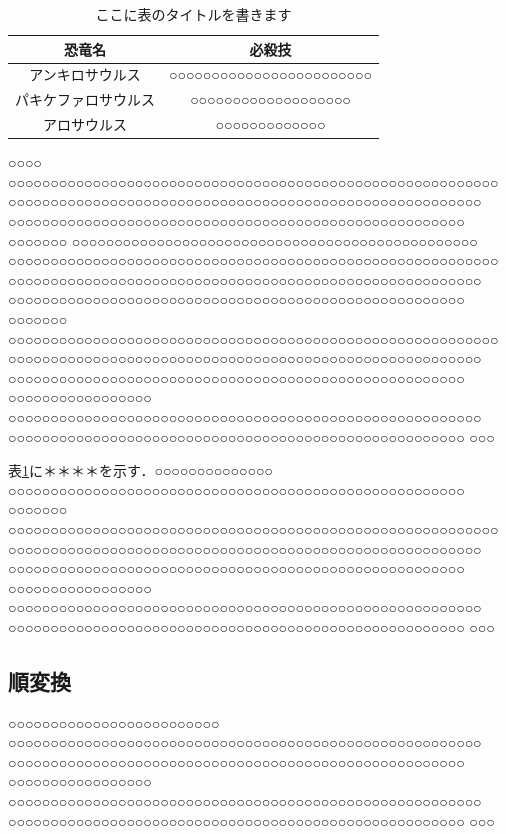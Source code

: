 \begin{table}
\begin{center}
\caption{ここに表のタイトルを書きます}\label{AAA}
\begin{tabular}{cc}
\hline
恐竜名 & 必殺技 \\
\hline
アンキロサウルス & ○○○○○○○○○○○○○○○○○○○○○○○○  \\
パキケファロサウルス & ○○○○○○○○○○○○○○○○○○○  \\
アロサウルス & ○○○○○○○○○○○○○  \\
\hline
\end{tabular}
\end{center}
\end{table}
○○○○ ○○○○○○○○○○○○○○○○○○○○○○○○○○○○○○○○○○○○○○○○○○○○○○○○○○○○○○○○○○ ○○○○○○○○○○○○○○○○○○○○○○○○○○○○○○○○○○○○○○○○○○○○○○○○○○○○○○○○ ○○○○○○○○○○○○○○○○○○○○○○○○○○○○○○○○○○○○○○○○○○○○○○○○○○○○○○ ○○○○○○○ ○○○○○○○○○○○○○○○○○○○○○○○○○○○○○○○○○○○○○○○○○○○○○○○○ ○○○○○○○○○○○○○○○○○○○○○○○○○○○○○○○○○○○○○○○○○○○○○○○○○○○○○○○○○○ ○○○○○○○○○○○○○○○○○○○○○○○○○○○○○○○○○○○○○○○○○○○○○○○○○○○○○○○○ ○○○○○○○○○○○○○○○○○○○○○○○○○○○○○○○○○○○○○○○○○○○○○○○○○○○○○○ ○○○○○○○ ○○○○○○○○○○○○○○○○○○○○○○○○○○○○○○○○○○○○○○○○○○○○○○○○○○○○○○○○○○ ○○○○○○○○○○○○○○○○○○○○○○○○○○○○○○○○○○○○○○○○○○○○○○○○○○○○○○○○ ○○○○○○○○○○○○○○○○○○○○○○○○○○○○○○○○○○○○○○○○○○○○○○○○○○○○○○ ○○○○○○○○○○○○○○○○○ ○○○○○○○○○○○○○○○○○○○○○○○○○○○○○○○○○○○○○○○○○○○○○○○○○○○○○○○○ ○○○○○○○○○○○○○○○○○○○○○○○○○○○○○○○○○○○○○○○○○○○○○○○○○○○○○○ ○○○

表\ref{AAA}に＊＊＊＊を示す．○○○○○○○○○○○○○○ ○○○○○○○○○○○○○○○○○○○○○○○○○○○○○○○○○○○○○○○○○○○○○○○○○○○○○○ ○○○○○○○ ○○○○○○○○○○○○○○○○○○○○○○○○○○○○○○○○○○○○○○○○○○○○○○○○○○○○○○○○○○ ○○○○○○○○○○○○○○○○○○○○○○○○○○○○○○○○○○○○○○○○○○○○○○○○○○○○○○○○ ○○○○○○○○○○○○○○○○○○○○○○○○○○○○○○○○○○○○○○○○○○○○○○○○○○○○○○ ○○○○○○○○○○○○○○○○○ ○○○○○○○○○○○○○○○○○○○○○○○○○○○○○○○○○○○○○○○○○○○○○○○○○○○○○○○○ ○○○○○○○○○○○○○○○○○○○○○○○○○○○○○○○○○○○○○○○○○○○○○○○○○○○○○○ ○○○
\subsection{順変換}\label{QWERT}
○○○○○○○○○○○○○○○○○○○○○○○○○ ○○○○○○○○○○○○○○○○○○○○○○○○○○○○○○○○○○○○○○○○○○○○○○○○○○○○○○○○ ○○○○○○○○○○○○○○○○○○○○○○○○○○○○○○○○○○○○○○○○○○○○○○○○○○○○○○ ○○○○○○○○○○○○○○○○○ ○○○○○○○○○○○○○○○○○○○○○○○○○○○○○○○○○○○○○○○○○○○○○○○○○○○○○○○○ ○○○○○○○○○○○○○○○○○○○○○○○○○○○○○○○○○○○○○○○○○○○○○○○○○○○○○○ ○○○
